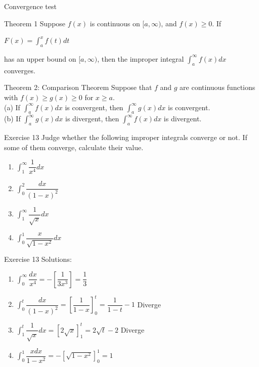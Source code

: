 \documentclass{beamer}
\begin{document}
\begin{frame}{Convergence test}
\begin{block}{Theorem 1}
Suppose $f(x)$ is continuous on $[a, \infty)$, and $f(x) \geq 0$. If 
\begin{center}
$F(x)=\int_{a}^{x}f(t)dt$
\end{center}
has an upper bound on $[a, \infty)$, then the improper integral $\int_{a}^{\infty}f(x)dx$ converges.
\end{block}
\begin{block}{Theorem 2: Comparison Theorem}
    Suppose that $f$ and $g$ are continuous functions with $f(x) \geqslant g(x) \geqslant 0$ for $x \geqslant a$.\\
(a) If $\int_{a}^{\infty} f(x) d x$ is convergent, then $\int_{a}^{\infty} g(x) d x$ is convergent.\\
(b) If $\int_{a}^{\infty} g(x) d x$ is divergent, then $\int_{a}^{\infty} f(x) d x$ is divergent.
\end{block}
\end{frame}




\begin{frame}{Exercise 13}
Judge whether the following improper integrals converge or not. If some of them converge, calculate their value.
\begin{enumerate}
\item $\int_{1}^{\infty}\dfrac{1}{x^{4}}dx$
\item $\int_{0}^{2}\dfrac{dx}{(1-x)^{2}}$
\item $\int_{1}^{\infty}\dfrac{1}{\sqrt{x}}dx$
\item $\int_{0}^{1} \dfrac{x}{\sqrt{1-x^{2}}}dx$
\end{enumerate}
\end{frame}

\begin{frame}{Exercise 13}
Solutions:

\begin{enumerate}
    \item $\int_0^{\infty} \dfrac{dx}{x^4} = -\left[\dfrac{1}{3x^3}\right] = \dfrac{1}{3}$
    
    \item $\int_{0}^t \dfrac{dx}{(1-x)^2} = \left[\dfrac{1}{1-x}\right]_0^t = \dfrac{1}{1-t} - 1$ Diverge
    
    \item $\int_1^t \dfrac{1}{\sqrt{x}}dx = [2\sqrt{x}]_1^t = 2\sqrt{t} - 2$ Diverge
    
    \item $\int_0^1 \dfrac{xdx}{1-x^2} = -[\sqrt{1-x^2}]_0^1 = 1$
\end{enumerate}
\end{frame}
\end{document}
